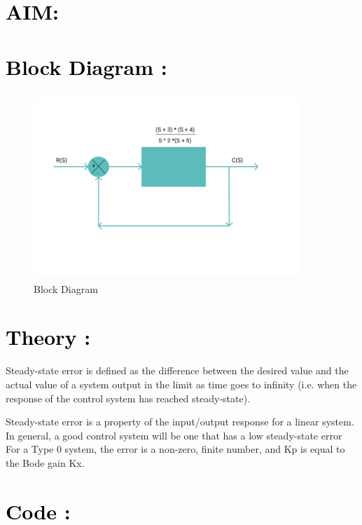 \documentclass[12pt]{article}
\begin{document}
\section*{\textcolor{black}{AIM: }}

\section*{\textcolor{black}{Block Diagram :}}

\begin{figure}[!hth]
        \centering
        \includegraphics[width =10cm, height = 7cm]{images/exp9.png}
        \caption{Block Diagram}
        \label{Graph}
\end{figure}


\section*{\textcolor{black}{Theory :}}
Steady-state error is defined as the difference between the desired value and the actual value of a system output in the limit as time goes to infinity (i.e. when the response of the control system has reached steady-state).\par

Steady-state error is a property of the input/output response for a linear system. In general, a good control system will be one that has a low steady-state error
For a Type 0 system, the error is a non-zero, finite number, and Kp is equal to the Bode gain Kx. \par

\section*{\textcolor{black}{Code :}}
\end{document}
